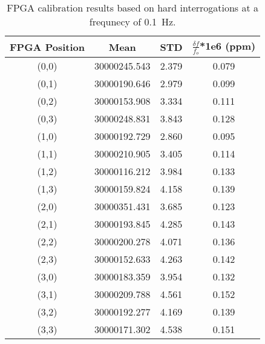 \begin{table}
	\begin{center}
		\begin{tabular}{|c|c|c|c|}
			\hline
			FPGA Position & Mean & STD & $\frac{\delta f}{f_{o}}$*1e6 (ppm) \\
			\hline
			(0,0) & 30000245.543 & 2.379 & 0.079 \\
			\hline
			(0,1) & 30000190.646 & 2.979 & 0.099 \\
			\hline
			(0,2) & 30000153.908 & 3.334 & 0.111 \\
			\hline
			(0,3) & 30000248.831 & 3.843 & 0.128 \\
			\hline
			(1,0) & 30000192.729 & 2.860 & 0.095 \\
			\hline
			(1,1) & 30000210.905 & 3.405 & 0.114 \\
			\hline
			(1,2) & 30000116.212 & 3.984 & 0.133 \\
			\hline
			(1,3) & 30000159.824 & 4.158 & 0.139 \\
			\hline
			(2,0) & 30000351.431 & 3.685 & 0.123 \\
			\hline
			(2,1) & 30000193.845 & 4.285 & 0.143 \\
			\hline
			(2,2) & 30000200.278 & 4.071 & 0.136 \\
			\hline
			(2,3) & 30000152.633 & 4.263 & 0.142 \\
			\hline
			(3,0) & 30000183.359 & 3.954 & 0.132 \\
			\hline
			(3,1) & 30000209.788 & 4.561 & 0.152 \\
			\hline
			(3,2) & 30000192.277 & 4.169 & 0.139 \\
			\hline
			(3,3) & 30000171.302 & 4.538 & 0.151 \\
			\hline
		\end{tabular}
	\end{center}
	\caption{FPGA calibration results based on hard interrogations at a frequnecy of 0.1~\unit{Hz}.}
	\label{tab:fpga_slow_calibration}
\end{table}